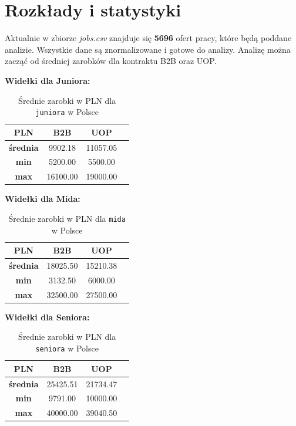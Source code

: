 \documentclass[a4paper]{article}
\begin{document}
\newpage

\section{Rozkłady i statystyki}

\quad Aktualnie w zbiorze \textit{jobs.csv} znajduje się \textbf{5696} ofert pracy, które będą poddane
analizie. Wszystkie dane są znormalizowane i gotowe do analizy. Analizę można zacząć od średniej zarobków
dla kontraktu B2B oraz UOP.


\textbf{Widełki dla Juniora: }

\begin{table}[H]
    \centering
    \begin{tabular}{|c|c|c|c|}
        \hline
        \textbf{PLN}     & \textbf{B2B} & \textbf{UOP} \\ \hline
        \textbf{średnia} & 9902.18      & 11057.05     \\ \hline
        \textbf{min}     & 5200.00      & 5500.00      \\ \hline
        \textbf{max}     & 16100.00     & 19000.00     \\ \hline
    \end{tabular}
    \caption{Średnie zarobki w PLN dla \texttt{juniora} w Polsce}
\end{table}

\textbf{Widełki dla Mida: }

\begin{table}[H]
    \centering
    \begin{tabular}{|c|c|c|c|}
        \hline
        \textbf{PLN}     & \textbf{B2B} & \textbf{UOP} \\ \hline
        \textbf{średnia} & 18025.50     & 15210.38     \\ \hline
        \textbf{min}     & 3132.50      & 6000.00      \\ \hline
        \textbf{max}     & 32500.00     & 27500.00     \\ \hline
    \end{tabular}
    \caption{Średnie zarobki w PLN dla \texttt{mida} w Polsce}
\end{table}

\textbf{Widełki dla Seniora: }

\begin{table}[H]
    \centering
    \begin{tabular}{|c|c|c|c|}
        \hline
        \textbf{PLN}     & \textbf{B2B} & \textbf{UOP} \\ \hline
        \textbf{średnia} & 25425.51     & 21734.47     \\ \hline
        \textbf{min}     & 9791.00      & 10000.00     \\ \hline
        \textbf{max}     & 40000.00     & 39040.50     \\ \hline
    \end{tabular}
    \caption{Średnie zarobki w PLN dla \texttt{seniora} w Polsce}
\end{table}
\end{document}
